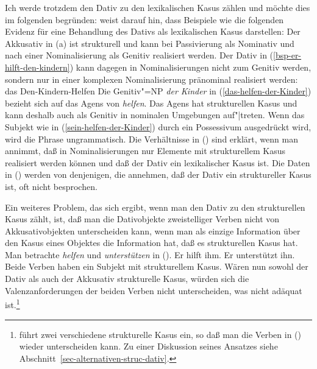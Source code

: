 Ich werde trotzdem den Dativ zu den lexikalischen Kasus zählen und möchte dies im folgenden
begründen: \citet[]{Haider86} weist darauf hin, dass Beispiele wie die folgenden Evidenz
für eine Behandlung des Dativs als lexikalischen Kasus darstellen:
\eal
{}
\label{das-helfen-der-Kinder}
\label{sein-helfen-der-Kinder}
\zl
Der Akkusativ in (a) ist strukturell und kann bei Passivierung als Nominativ
und nach einer Nominalisierung als Genitiv realisiert werden.
Der Dativ in (\ref{bsp-er-hilft-den-kindern}) kann dagegen in Nominalisierungen nicht zum Genitiv werden,
sondern nur in einer komplexen Nominalisierung pränominal realisiert werden:
\ea
das Den-Kindern-Helfen
\z
Die Genitiv"=NP \emph{der Kinder} in (\ref{das-helfen-der-Kinder}) bezieht sich auf das Agens
von \emph{helfen}. Das Agens hat strukturellen Kasus und kann deshalb auch als Genitiv in
nominalen Umgebungen auf"|treten. Wenn das Subjekt wie in (\ref{sein-helfen-der-Kinder})
durch ein Possessivum ausgedrückt wird, wird die Phrase ungrammatisch. Die Verhältnisse in
() sind erklärt, wenn man annimmt, daß in Nominalisierungen nur Elemente mit strukturellem
Kasus realisiert werden können und daß der Dativ ein lexikalischer Kasus ist.
Die Daten in ()
werden von denjenigen, die annehmen, daß der Dativ ein struktureller Kasus ist, oft
nicht besprochen.

Ein weiteres Problem, das sich ergibt, wenn man den Dativ zu den strukturellen Kasus
zählt, ist, daß man die Dativobjekte zweistelliger Verben
nicht von Akkusativobjekten
unterscheiden kann, wenn man als einzige Information über den Kasus eines Objektes
die Information hat, daß es strukturellen Kasus hat. Man betrachte \zb \emph{helfen} und
\emph{unterstützen} in ().
\eal
\ex Er hilft ihm.
\ex Er unterstützt ihn.
\zl
Beide Verben haben ein Subjekt mit strukturellem Kasus. Wären nun sowohl der Dativ als auch der
Akkusativ strukturelle Kasus, würden sich die Valenzanforderungen der beiden Verben nicht
unterscheiden, was nicht adäquat ist.\footnote{
  \citet{Gunkel2003b} führt zwei verschiedene strukturelle Kasus ein, so daß man die Verben in
  () wieder unterscheiden kann. Zu einer Diskussion seines Ansatzes siehe
  Abschnitt~\ref{sec-alternativen-struc-dativ}.%
}

